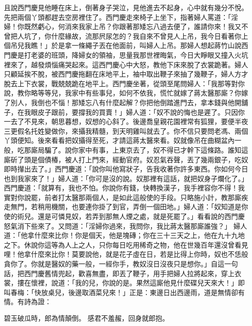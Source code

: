 \begin{showcontents}{}
且說西門慶見他睡在床上，倒著身子哭泣，見他進去不起身，心中就有幾分不悅。先把兩個丫頭都趕去空房裡住了。西門慶走來椅子上坐下，指著婦人罵道：「淫婦！你既然虧心，何消來我家上吊？你跟著那矮忘八過去便了，誰請你來！我又不曾把人坑了，你什麼緣故，流那屄尿怎的？我自來不曾見人上吊，我今日看著你上個吊兒我瞧！」於是拿一條繩子丟在他面前，叫婦人上吊。那婦人想起蔣竹山說西門慶是打老婆的班頭，降婦女的領袖，思量我那世裡晦氣，今日大睜眼又撞入火坑裡來了，越發煩惱痛哭起來。這西門慶心中大怒，教他下床來脫了衣裳跪著。婦人只顧延挨不脫，被西門慶拖翻在床地平上，袖中取出鞭子來抽了幾鞭子，婦人方才脫去上下衣裳，戰兢兢跪在地平上。西門慶坐著，從頭至尾問婦人：「我那等對你說，教你略等等兒，我家中有些事兒，如何不依我，慌忙就嫁了蔣太醫那廝？你嫁了別人，我倒也不惱！那矮忘八有什麼起解？你把他倒踏進門去，拿本錢與他開舖子，在我眼皮子跟前，要撐我的買賣！」婦人道：「奴不說的悔也是遲了。只因你一去了不見來，朝思暮想，奴想的心斜了。後邊喬皇親花園裡常有狐狸，要便半夜三更假名托姓變做你，來攝我精髓，到天明雞叫就去了。你不信只要問老馮、兩個丫頭便知。後來看看把奴攝得至死，才請這蔣太醫來看。奴就像吊在曲糊盆內一般，吃那廝局騙了。說你家中有事，上東京去了，奴不得已才幹下這條路。誰知這廝斫了頭是個債椿，被人打上門來，經動官府。奴忍氣吞聲，丟了幾兩銀子，吃奴即時攆出去了。」西門慶道：「說你叫他寫狀子，告我收著你許多東西。你如何今日也到我家來了！」婦人道：「你可是沒的說。奴那裡有這話，就把奴身子爛化了。」西門慶道：「就算有，我也不怕。你說你有錢，快轉換漢子，我手裡容你不得！我實對你說罷，前者打太醫那兩個人，是如此這般使的手段。只略施小計，教那廝疾走無門，若稍用機關，也要連你掛了到官，弄倒一個田地。」婦人道：「奴知道是你使的術兒。還是可憐見奴，若弄到那無人煙之處，就是死罷了。」看看說的西門慶怒氣消下些來了。又問道：「淫婦你過來，我問你，我比蔣太醫那廝誰強？」 婦人道：「他拿什麼來比你！你是個天，他是塊磚；你在三十三天之上，他在九十九地之下。休說你這等為人上之人，只你每日吃用稀奇之物，他在世幾百年還沒曾看見哩！他拿什麼來比你！莫要說他，就是花子虛在日，若是比得上你時，奴也不恁般貪你了。你就是醫奴的藥一般，一經你手，教奴沒日沒夜只是想你。」自這一句話，把西門慶舊情兜起，歡喜無盡，即丟了鞭子，用手把婦人拉將起來，穿上衣裳，摟在懷裡，說道：「我的兒，你說的是。果然這廝他見什麼碟兒天來大！」即叫春梅：「快放桌兒，後邊取酒菜兒來！」正是：東邊日出西邊雨，道是無情卻有情。有詩為證：

碧玉破瓜時，郎為情顛倒。
感君不羞赧，回身就郎抱。




\end{showcontents}
